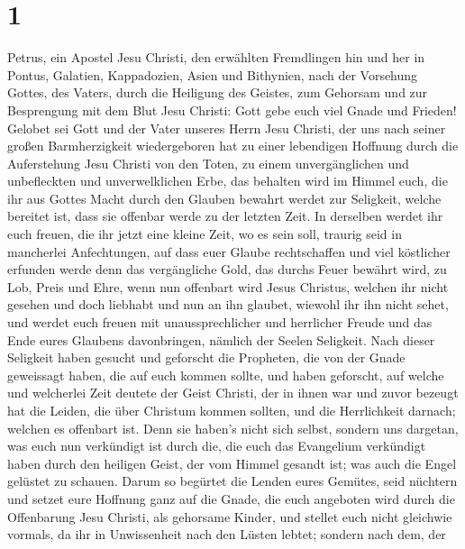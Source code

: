 \hypertarget{section}{%
\section{1}\label{section}}

 Petrus, ein Apostel Jesu Christi, den erwählten Fremdlingen
hin und her in Pontus, Galatien, Kappadozien, Asien und Bithynien,
 nach der Vorsehung Gottes, des Vaters, durch die Heiligung
des Geistes, zum Gehorsam und zur Besprengung mit dem Blut Jesu Christi:
Gott gebe euch viel Gnade und Frieden!  Gelobet sei Gott und
der Vater unseres Herrn Jesu Christi, der uns nach seiner großen
Barmherzigkeit wiedergeboren hat zu einer lebendigen Hoffnung durch die
Auferstehung Jesu Christi von den Toten,  zu einem
unvergänglichen und unbefleckten und unverwelklichen Erbe, das behalten
wird im Himmel  euch, die ihr aus Gottes Macht durch den
Glauben bewahrt werdet zur Seligkeit, welche bereitet ist, dass sie
offenbar werde zu der letzten Zeit.  In derselben werdet ihr
euch freuen, die ihr jetzt eine kleine Zeit, wo es sein soll, traurig
seid in mancherlei Anfechtungen,  auf dass euer Glaube
rechtschaffen und viel köstlicher erfunden werde denn das vergängliche
Gold, das durchs Feuer bewährt wird, zu Lob, Preis und Ehre, wenn nun
offenbart wird Jesus Christus,  welchen ihr nicht gesehen
und doch liebhabt und nun an ihn glaubet, wiewohl ihr ihn nicht sehet,
und werdet euch freuen mit unaussprechlicher und herrlicher Freude
 und das Ende eures Glaubens davonbringen, nämlich der
Seelen Seligkeit.  Nach dieser Seligkeit haben gesucht und
geforscht die Propheten, die von der Gnade geweissagt haben, die auf
euch kommen sollte,  und haben geforscht, auf welche und
welcherlei Zeit deutete der Geist Christi, der in ihnen war und zuvor
bezeugt hat die Leiden, die über Christum kommen sollten, und die
Herrlichkeit darnach;  welchen es offenbart ist. Denn sie
haben's nicht sich selbst, sondern uns dargetan, was euch nun verkündigt
ist durch die, die euch das Evangelium verkündigt haben durch den
heiligen Geist, der vom Himmel gesandt ist; was auch die Engel gelüstet
zu schauen.  Darum so begürtet die Lenden eures Gemütes,
seid nüchtern und setzet eure Hoffnung ganz auf die Gnade, die euch
angeboten wird durch die Offenbarung Jesu Christi,  als
gehorsame Kinder, und stellet euch nicht gleichwie vormals, da ihr in
Unwissenheit nach den Lüsten lebtet;  sondern nach dem, der
